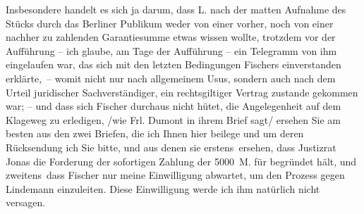 \pstart
           Insbesondere handelt es sich ja darum, dass L.
               nach der matten Aufnahme des Stücks durch das Berliner Publikum weder
               von einer vorher, noch von einer nachher zu zahlenden Garantiesumme etwas wissen
               wollte, trotzdem vor der Aufführung – ich glaube, am Tage der Aufführung – ein
               Telegramm \introOben{}von ihm\introOben{} eingelaufen war, das sich mit den letzten
               Bedingungen Fischers einverstanden erklärte, –
               womit nicht nur nach allgemeinem Usus, sondern auch nach dem Urteil juridischer
               Sachverständiger, ein rechtsgiltiger Vertrag zustande gekommen war; \introOben{}–\introOben{} und dass sich Fischer durchaus nicht hütet, die Angelegenheit auf dem Klageweg zu
                  erledi{\pb}gen, /wie Frl. Dumont in ihrem Brief sagt/ ersehen Sie am besten aus den zwei
               Briefen, die ich Ihnen hier beilege und um deren Rücksendung ich Sie bitte, und aus
               denen sie erstens ersehen, dass Justizrat Jonas
               die Forderung der sofortigen Zahlung der 5000 M. für begründet hält, und
               zweitens dass Fischer nur meine Einwilligung
               abwartet, um den Prozess gegen Lindemann
               einzuleiten. Diese Einwilligung werde ich ihm natürlich nicht versagen.\pend
           
